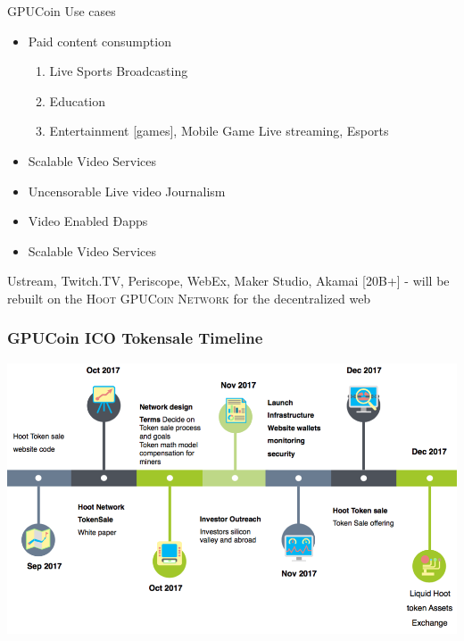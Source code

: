\documentclass[10pt]{beamer}
\begin{document}
\begin{frame}[fragile]{GPUCoin Use cases}
 \begin{itemize}[<+-| alert@+>]%
	 
\item {Paid content consumption}
\begin{enumerate}[<+-| alert@+>]
\item Live Sports Broadcasting
\item Education 
\item Entertainment [games], Mobile Game Live streaming, Esports
\end{enumerate}
\item {Scalable Video Services}
\item {Uncensorable Live video Journalism}
\item {Video Enabled Ðapps}
\item {Scalable Video Services}

\end{itemize}
\pause

\Large{
Ustream, Twitch.TV, Periscope, WebEx, Maker Studio, Akamai [20B+] - will be rebuilt on the \textsc{Hoot GPUCoin Network} for the decentralized web
}

\end{frame}
\begin{frame}[t]\frametitle{GPUCoin ICO Tokensale Timeline}
     \includegraphics[width=1.0\textwidth]{static/tstimeline-trans}
\end{frame}
\end{document}
